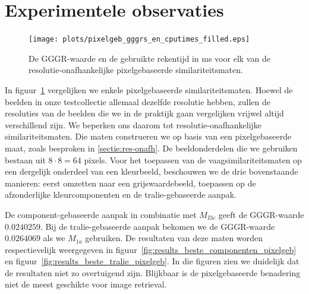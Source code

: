 \section{Experimentele observaties}

\begin{figure}[tbp]
\begin{center}
\texttt{[image: plots/pixelgeb\_gggrs\_en\_cputimes\_filled.eps]}
\caption{\label{fig:pixelgeb_gggrs_en_cputimes}De GGGR-waarde en de gebruikte rekentijd in ms voor elk van de resolutie-onafhankelijke pixelgebaseerde similariteitsmaten.}
\end{center}
\end{figure}

In figuur~\ref{fig:pixelgeb_gggrs_en_cputimes} vergelijken we enkele pixelgebaseerde similariteitsmaten.
Hoewel de beelden in onze testcollectie allemaal dezelfde resolutie hebben, zullen de
resoluties van de beelden die we in de praktijk gaan vergelijken vrijwel altijd verschillend zijn.
We beperken ons daarom tot resolutie-onafhankelijke similariteitsmaten. Die maten construeren
we op basis van een pixelgebaseerde maat, zoals besproken in \ref{sectie:res-onafh}. De 
beeldonderdelen die we gebruiken bestaan uit $8 \cdot 8 = 64$ pixels.
Voor het toepassen van de vaagsimilariteitsmaten op een 
dergelijk onderdeel van een kleurbeeld, beschouwen we de drie bovenstaande manieren:
eerst omzetten naar een grijswaardebeeld, 
toepassen op de afzonderlijke kleurcomponenten en 
de tralie-gebaseerde aanpak.

De component-gebaseerde aanpak in 
combinatie met $M_{I3c}$ geeft de GGGR-waarde $0.0240259$. Bij de tralie-gebaseerde aanpak
bekomen we de GGGR-waarde $0.0264069$ als we $M_{1a}$ gebruiken. De resultaten van deze
maten worden respectievelijk weergegeven in figuur~\ref{fig:results_beste_componenten_pixelgeb} en
figuur~\ref{fig:results_beste_tralie_pixelgeb}.
In die figuren zien we duidelijk dat de resultaten niet zo overtuigend zijn. Blijkbaar 
is de pixelgebaseerde benadering niet de meest geschikte voor image retrieval. 

